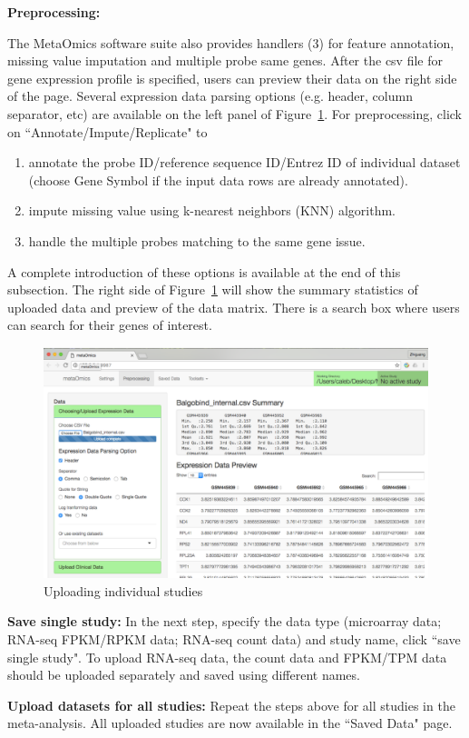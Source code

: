 \begin{steps}
\item \textbf{Preprocessing:}

The MetaOmics software suite also provides handlers {\color{red} (3)} for feature annotation, missing value imputation and multiple probe same genes.
After the csv file for gene expression profile is specified, 
users can preview their data on the right side of the page.
Several expression data parsing options (e.g. header, column separator, etc) are available on the left panel of Figure~\ref{fig:GUIpreview}.
For preprocessing, 
click on ``Annotate/Impute/Replicate" to 
\begin{enumerate}
\item annotate the probe ID/reference sequence ID/Entrez ID of individual dataset (choose Gene Symbol if the input data rows are already annotated).
\item impute missing value using k-nearest neighbors (KNN) algorithm.
\item handle the multiple probes matching to the same gene issue.
\end{enumerate}

A complete introduction of these options is available at the end of this subsection.
The right side of Figure~\ref{fig:GUIpreview} will show the summary statistics of uploaded data and preview of the data matrix.
There is a search box where users can search for their genes of interest.

\begin{figure}[H]
\begin{center}
\includegraphics[scale=0.7]{./figure/preprocessing/GUIpreview}
\caption{Uploading individual studies}
\label{fig:GUIpreview}
\end{center}
\end{figure}

\item \textbf{Save single study:}
In the next step,
specify the data type (microarray data; RNA-seq FPKM/RPKM data; RNA-seq count data) and study name,
click ``save single study".
To upload RNA-seq data, the count data and FPKM/TPM
 data should be uploaded separately and saved using different names.

\item \textbf{Upload datasets for all studies:}
Repeat the steps above for all studies in the meta-analysis.
All uploaded studies are now available in the ``Saved Data" page. 
 
\end{steps}

